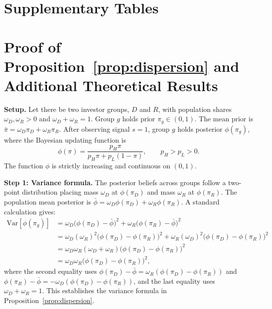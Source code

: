 \documentclass[12pt]{article}
\begin{document}
\appendix

\section{Supplementary Tables}
\label{app:tables}









\section{Proof of Proposition~\ref{prop:dispersion} and Additional Theoretical Results}
\label{app:proofs}

\noindent\textbf{Setup.} Let there be two investor groups, $D$ and $R$, with
population shares $\omega_D, \omega_R > 0$ and $\omega_D + \omega_R = 1$. Group $g$ holds prior
$\pi_g \in (0,1)$. The mean prior is $\bar{\pi} = \omega_D \pi_D + \omega_R \pi_R$.
After observing signal $s=1$, group $g$ holds posterior
$\phi(\pi_g)$, where the Bayesian updating function is
\[
    \phi(\pi) = \frac{p_H \pi}{p_H \pi + p_L(1-\pi)},
    \qquad p_H > p_L > 0.
\]
The function $\phi$ is strictly increasing and continuous on $(0,1)$.

\medskip
\noindent\textbf{Step 1: Variance formula.}
The posterior beliefs across groups follow a two-point distribution placing
mass $\omega_D$ at $\phi(\pi_D)$ and mass $\omega_R$ at $\phi(\pi_R)$. The population
mean posterior is $\bar{\phi} = \omega_D \phi(\pi_D) + \omega_R \phi(\pi_R)$. A
standard calculation gives:
\begin{align*}
    \mathrm{Var}[\phi(\pi_g)]
    &= \omega_D\bigl(\phi(\pi_D) - \bar\phi\bigr)^2
     + \omega_R\bigl(\phi(\pi_R) - \bar\phi\bigr)^2 \\
    &= \omega_D (\omega_R)^2 \bigl(\phi(\pi_D) - \phi(\pi_R)\bigr)^2
     + \omega_R (\omega_D)^2 \bigl(\phi(\pi_D) - \phi(\pi_R)\bigr)^2 \\
    &= \omega_D \omega_R (\omega_D + \omega_R) \bigl(\phi(\pi_D) - \phi(\pi_R)\bigr)^2 \\
    &= \omega_D \omega_R \bigl(\phi(\pi_D) - \phi(\pi_R)\bigr)^2,
\end{align*}
where the second equality uses $\phi(\pi_D) - \bar\phi = \omega_R(\phi(\pi_D) -
\phi(\pi_R))$ and $\phi(\pi_R) - \bar\phi = -\omega_D(\phi(\pi_D) - \phi(\pi_R))$,
and the last equality uses $\omega_D + \omega_R = 1$. This establishes the variance
formula in Proposition~\ref{prop:dispersion}.
\end{document}
